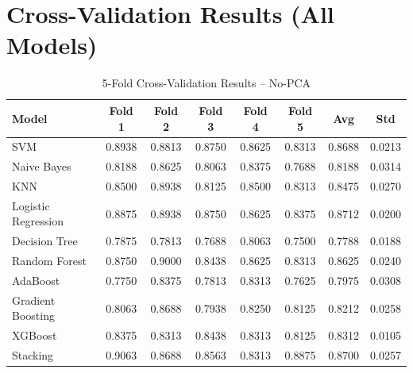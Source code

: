 \documentclass[12pt,a4paper]{article}
\begin{document}
\section{Cross-Validation Results (All Models)}
\begin{table}[H]
\centering
\caption{5-Fold Cross-Validation Results -- No-PCA}
\begin{tabular}{lccccccc}
\toprule
Model & Fold 1 & Fold 2 & Fold 3 & Fold 4 & Fold 5 & Avg & Std \\
\midrule
SVM & 0.8938 & 0.8813 & 0.8750 & 0.8625 & 0.8313 & 0.8688 & 0.0213 \\
Naive Bayes & 0.8188 & 0.8625 & 0.8063 & 0.8375 & 0.7688 & 0.8188 & 0.0314 \\
KNN & 0.8500 & 0.8938 & 0.8125 & 0.8500 & 0.8313 & 0.8475 & 0.0270 \\
Logistic Regression & 0.8875 & 0.8938 & 0.8750 & 0.8625 & 0.8375 & 0.8712 & 0.0200 \\
Decision Tree & 0.7875 & 0.7813 & 0.7688 & 0.8063 & 0.7500 & 0.7788 & 0.0188 \\
Random Forest & 0.8750 & 0.9000 & 0.8438 & 0.8625 & 0.8313 & 0.8625 & 0.0240 \\
AdaBoost & 0.7750 & 0.8375 & 0.7813 & 0.8313 & 0.7625 & 0.7975 & 0.0308 \\
Gradient Boosting & 0.8063 & 0.8688 & 0.7938 & 0.8250 & 0.8125 & 0.8212 & 0.0258 \\
XGBoost & 0.8375 & 0.8313 & 0.8438 & 0.8313 & 0.8125 & 0.8312 & 0.0105 \\
Stacking & 0.9063 & 0.8688 & 0.8563 & 0.8313 & 0.8875 & 0.8700 & 0.0257 \\
\bottomrule
\end{tabular}
\end{table}
\end{document}
